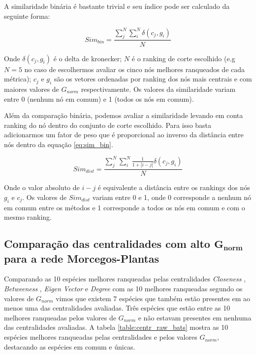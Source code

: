 \documentclass[
  12pt,
]{article}
\begin{document}
A similaridade binária é bastante trivial e seu índice pode ser
calculado da seguinte forma:

\begin{equation} \label{eq:sim_bin}
Sim_{bin} = \frac{\sum_{j}^N\sum_{i}^N\delta(c_j, g_i)}{N}
\end{equation}

Onde \(\delta(c_j, g_i)\) é o delta de kronecker; \(N\) é o ranking de
corte escolhido (e.g \(N=5\) no caso de escolhermos avaliar os cinco nós
melhores ranqueados de cada métrica); \(c_j\) e \(g_i\) são os vetores
ordenadas por ranking dos nós mais centrais e com maiores valores de
\(G_{norm}\) respectivamente. Os valores da similaridade variam entre 0
(nenhum nó em comum) e 1 (todos os nós em comum).

Além da comparação binária, podemos avaliar a similaridade levando em
conta ranking do nó dentro do conjunto de corte escolhido. Para isso
basta adicionarmos um fator de peso que é proporcional ao inverso da
distância entre nós dentro da equação \ref{eq:sim_bin}.

\begin{equation} \label{eq:sim_dist}
Sim_{dist} = \frac{\sum_{j}^{N}\sum_{i}^{N}\frac{1}{1+|i-j|}\delta(c_j, g_i)}{N}
\end{equation}

Onde o valor absoluto de \(i-j\) é equivalente a distância entre os
rankings dos nós \(g_i\) e \(c_j\). Os valores de \(Sim_{dist}\) variam
entre 0 e 1, onde 0 corresponde a nenhum nó em comum entre os métodos e
1 corresponde a todos os nós em comum e com o mesmo ranking.

\hypertarget{comparauxe7uxe3o-das-centralidades-com-alto-mathbfg_norm-para-a-rede-morcegos-plantas}{%
\subsection{\texorpdfstring{Comparação das centralidades com alto
\(\mathbf{G_{norm}}\) para a rede
Morcegos-Plantas}{Comparação das centralidades com alto \textbackslash mathbf\{G\_\{norm\}\} para a rede Morcegos-Plantas}}\label{comparauxe7uxe3o-das-centralidades-com-alto-mathbfg_norm-para-a-rede-morcegos-plantas}}

Comparando as 10 espécies melhores ranqueadas pelas centralidades
\textit{Closeness} , \textit{Betweeness} , \textit{Eigen Vector} e
\textit{Degree} com as 10 melhores ranqueadas segundo os valores de
\(G_{norm}\) vimos que existem 7 espécies que também estão presentes em
ao menos uma das centralidades avaliadas. Três espécies que estão entre
as 10 melhores ranqueadas pelos valores de \(G_{norm}\) e não estavam
presentes em nenhuma das centralidades avaliadas. A tabela
\ref{table:centr_raw_bats} mostra as 10 espécies melhores ranqueadas
pelas centralidades e pelos valores \(G_{norm}\), destacando as espécies
em comum e únicas.
\end{document}
